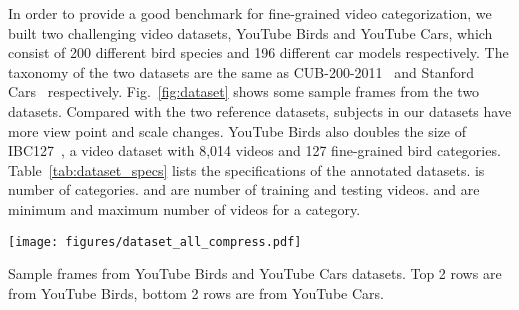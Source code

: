 \documentclass[runningheads]{llncs}
\begin{document}
In order to provide a good benchmark for fine-grained video categorization, we built two challenging video datasets, YouTube Birds and YouTube Cars, which consist of 200 different bird species and 196 different car models respectively. The taxonomy of the two datasets are the same as CUB-200-2011~\cite{WahCUB_200_2011} and Stanford Cars~\cite{krause20133d} respectively. Fig.~\ref{fig:dataset} shows some sample frames from the two datasets.
Compared with the two reference datasets, subjects in our datasets have more view point and scale changes. YouTube Birds also doubles the size of IBC127~\cite{saito2016ibc127}, a video dataset with 8,014 videos and 127 fine-grained bird categories.
Table~\ref{tab:dataset_specs} lists the specifications of the annotated datasets.  is number of categories.  and  are number of training and testing videos.  and  are minimum and maximum number of videos for a category.
\begin{table}[htbp]
\begin{minipage}[b]{0.65\linewidth}
\centering
\texttt{[image: figures/dataset\_all\_compress.pdf]}
\caption{Sample frames from YouTube Birds and YouTube Cars datasets. Top 2 rows are from YouTube Birds, bottom 2 rows are from YouTube Cars.}
\label{fig:dataset}
\end{minipage}
\begin{minipage}[b]{0.34\linewidth}
  \centering
  \caption{Specifications of YouTube Birds and YouTube Cars. }
  \label{tab:dataset_specs}
\end{minipage}
\end{table}
\end{document}

